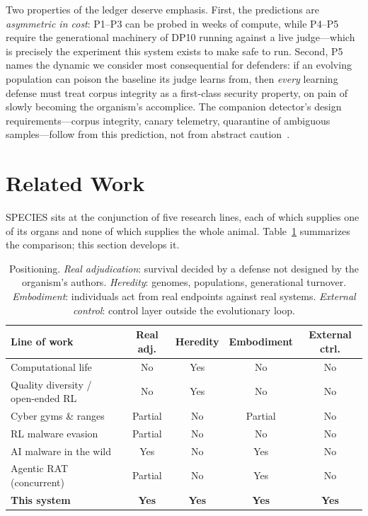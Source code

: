 \documentclass[11pt,a4paper]{article}
\begin{document}
Two properties of the ledger deserve emphasis. First, the predictions are \emph{asymmetric in cost}: P1--P3 can be probed in weeks of compute, while P4--P5 require the generational machinery of DP10 running against a live judge---which is precisely the experiment this system exists to make safe to run. Second, P5 names the dynamic we consider most consequential for defenders: if an evolving population can poison the baseline its judge learns from, then \emph{every} learning defense must treat corpus integrity as a first-class security property, on pain of slowly becoming the organism's accomplice. The companion detector's design requirements---corpus integrity, canary telemetry, quarantine of ambiguous samples---follow from this prediction, not from abstract caution~\cite{luo2026grammar}.

\section{Related Work}
\label{sec:related}

SPECIES sits at the conjunction of five research lines, each of which supplies one of its organs and none of which supplies the whole animal. Table~\ref{tab:positioning} summarizes the comparison; this section develops it.

\begin{table}[t]
\centering\small
\caption{Positioning. \emph{Real adjudication}: survival decided by a defense not designed by the organism's authors. \emph{Heredity}: genomes, populations, generational turnover. \emph{Embodiment}: individuals act from real endpoints against real systems. \emph{External control}: control layer outside the evolutionary loop.}
\label{tab:positioning}
\begin{tabular}{@{}l cccc@{}}
\toprule
Line of work & Real adj. & Heredity & Embodiment & External ctrl. \\
\midrule
Computational life~\cite{ray1991tierra,ofria2004avida,aguera2024computational} & No & Yes & No & No \\
Quality diversity / open-ended RL~\cite{lehman2011novelty,mouret2015mapelites,wang2019poet} & No & Yes & No & No \\
Cyber gyms \& ranges~\cite{cyborg2021,cyberbattlesim2021} & Partial & No & Partial & No \\
RL malware evasion~\cite{anderson2018gymmalware,quertier2022merlin} & Partial & No & No & No \\
AI malware in the wild~\cite{eset2025promptlock,certua2025lamehug,gtig2025ai} & Yes & No & Yes & No \\
Agentic RAT (concurrent)~\cite{you2026agenticrat} & Partial & No & Yes & No \\
\midrule
\textbf{This system} & \textbf{Yes} & \textbf{Yes} & \textbf{Yes} & \textbf{Yes} \\
\bottomrule
\end{tabular}
\end{table}
\end{document}
